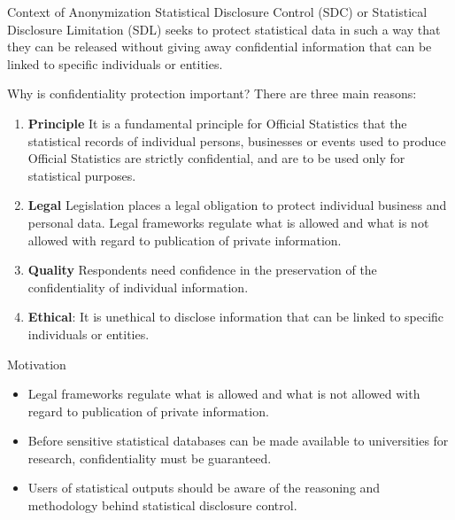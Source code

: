 \documentclass[
  ignorenonframetext,
  aspectratio=169,
]{beamer}
\begin{document}
\begin{frame}{Context of Anonymization}
\protect\hypertarget{context-of-anonymization}{}
Statistical Disclosure Control (SDC) or Statistical Disclosure
Limitation (SDL) seeks to protect statistical data in such a way that
they can be released without giving away confidential information that
can be linked to specific individuals or entities.
\end{frame}

\begin{frame}{Why is confidentiality protection important?}
\protect\hypertarget{why-is-confidentiality-protection-important}{}
There are three main reasons:

\begin{enumerate}
\item
  \textbf{Principle} It is a fundamental principle for Official
  Statistics that the statistical records of individual persons,
  businesses or events used to produce Official Statistics are strictly
  confidential, and are to be used only for statistical purposes.
\item
  \textbf{Legal} Legislation places a legal obligation to protect
  individual business and personal data. Legal frameworks regulate what
  is allowed and what is not allowed with regard to publication of
  private information.
\item
  \textbf{Quality} Respondents need confidence in the preservation of
  the confidentiality of individual information.
\item
  \textbf{Ethical}: It is unethical to disclose information that can be
  linked to specific individuals or entities.
\end{enumerate}
\end{frame}

\begin{frame}{Motivation}
\protect\hypertarget{motivation}{}
\begin{itemize}
\item
  Legal frameworks regulate what is allowed and what is not allowed with
  regard to publication of private information.
\item
  Before sensitive statistical databases can be made available to
  universities for research, confidentiality must be guaranteed.
\item
  Users of statistical outputs should be aware of the reasoning and
  methodology behind statistical disclosure control.
\end{itemize}
\end{frame}
\end{document}
